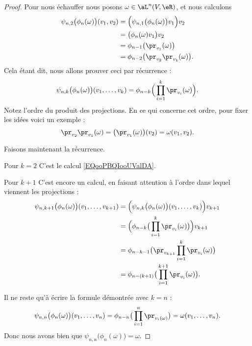 \begin{proof}
    Pour nous échauffer nous posons \( \omega\in\aL^n(V,\eR)\), et nous calculons
    \begin{subequations}        \label{EQooPBQIooUValDA}
        \begin{align}
            \psi_{n,2}\big( \phi_n(\omega) \big)(v_1,v_2)&=\Big( \psi_{n,1}\big( \phi_n(\omega) \big)v_1 \Big)v_2\\
            &=\big( \phi_n(\omega)v_1 \big)v_2\\
            &=\phi_{n-1}\big( \pr_{v_1}(\omega) \big)\\
            &=\phi_{n-2}\big( \pr_{v_2}\pr_{v_1}(\omega) \big).
        \end{align}
    \end{subequations}
    Cela étant dit, nous allons prouver ceci par récurrence :
    \begin{equation}
        \psi_{n,k}\big( \phi_n(\omega) \big)(v_1,\ldots, v_k)=\phi_{n-k}\Big( \prod_{i=1}^k\pr_{v_i}(\omega) \Big).
    \end{equation}
    Notez l'ordre du produit des projections. En ce qui concerne cet ordre, pour fixer les idées voici un exemple :
    \begin{equation}
        \pr_{v_2}\pr_{v_1}(\omega)=\big( \pr_{v_1}(\omega) \big)(v_2)=\omega(v_1,v_2).
    \end{equation}
    
    Faisons maintenant la récurrence.
    \begin{subproof}
        \item[Pour \( k=2\)]
            C'est le calcul \eqref{EQooPBQIooUValDA}.
        \item[Pour \( k+1\)]
            C'est encore un calcul, en faisant attention à l'ordre dans lequel viennent les projections :
            \begin{subequations}
                \begin{align}
                    \psi_{n,k+1}\big( \phi_n(\omega) \big)(v_1,\ldots, v_{k+1})&=\Big( \psi_{n,k}\big( \phi_n(\omega) \big)(v_1,\ldots, v_k) \Big)v_{k+1}\\
                    &=\Big( \phi_{n-k}\big( \prod_{i=1}^k\pr_{v_i}(\omega) \big) \Big)v_{k+1}\\
                    &=\phi_{n-k-1}\big( \pr_{v_{k+1}}\prod_{i=1}^k\pr_{v_i}(\omega) \big)\\
                    &=\phi_{n-(k+1)}\big( \prod_{i=1}^{k+1}\pr_{v_i}(\omega) \big).
                \end{align}
            \end{subequations}
    \end{subproof}
    Il ne reste qu'à écrire la formule démontrée avec \( k=n\) :
    \begin{equation}
        \psi_{n,n}\big( \phi_n(\omega) \big)(v_1,\ldots, v_n)=\phi_{n-n}\big( \prod_{i=1}^n\pr_{v_i(\omega)} \big)=\omega(v_1,\ldots, v_n).
    \end{equation}
    Donc nous avons bien que \( \psi_{n,n}\big( \phi_n(\omega) \big)=\omega\).
\end{proof}

